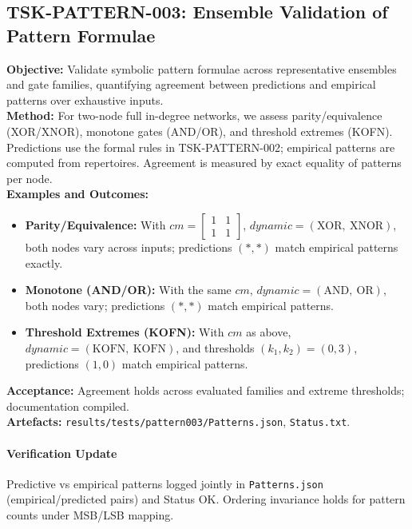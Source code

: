 \documentclass[11pt]{article}
\begin{document}
\subsection{TSK-PATTERN-003: Ensemble Validation of Pattern Formulae}
\textbf{Objective:} Validate symbolic pattern formulae across representative ensembles and gate families, quantifying agreement between predictions and empirical patterns over exhaustive inputs.\\
\textbf{Method:} For two-node full in-degree networks, we assess parity/equivalence (XOR/XNOR), monotone gates (AND/OR), and threshold extremes (KOFN). Predictions use the formal rules in TSK-PATTERN-002; empirical patterns are computed from repertoires. Agreement is measured by exact equality of patterns per node.\\
\textbf{Examples and Outcomes:}
\begin{itemize}
\item \textbf{Parity/Equivalence:} With \(cm = \begin{bmatrix}1 & 1\\ 1 & 1\end{bmatrix}\), \(dynamic=(\text{XOR},\ \text{XNOR})\), both nodes vary across inputs; predictions \((* , *)\) match empirical patterns exactly.
\item \textbf{Monotone (AND/OR):} With the same \(cm\), \(dynamic=(\text{AND},\ \text{OR})\), both nodes vary; predictions \((* , *)\) match empirical patterns.
\item \textbf{Threshold Extremes (KOFN):} With \(cm\) as above, \(dynamic=(\text{KOFN},\ \text{KOFN})\), and thresholds \((k_1,k_2)=(0,3)\), predictions \((1, 0)\) match empirical patterns.
\end{itemize}
\textbf{Acceptance:} Agreement holds across evaluated families and extreme thresholds; documentation compiled.\\
\textbf{Artefacts:} \texttt{results/tests/pattern003/Patterns.json}, \texttt{Status.txt}.\
\paragraph{Verification Update} Predictive vs empirical patterns logged jointly in \texttt{Patterns.json} (empirical/predicted pairs) and Status OK. Ordering invariance holds for pattern counts under MSB/LSB mapping.
\end{document}
